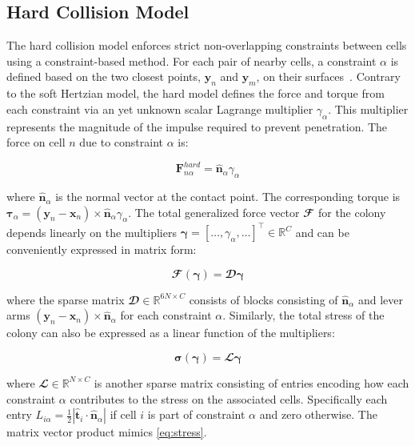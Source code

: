 \documentclass[conference]{IEEEtran}
\begin{document}
\subsection{Hard Collision Model}

The hard collision model enforces strict non-overlapping constraints between cells using a constraint-based method. For each pair of nearby cells, a constraint $\alpha$ is defined based on the two closest points, $\mathbf{y}_n$ and $\mathbf{y}_m$, on their surfaces~\cite{Weady2024SM}. Contrary to the soft Hertzian model, the hard model defines the force and torque from each constraint via an yet unknown scalar Lagrange multiplier $\gamma_\alpha$. This multiplier represents the magnitude of the impulse required to prevent penetration. The force on cell $n$ due to constraint $\alpha$ is:

\begin{equation} \label{eq:constraint_force}
    \mathbf{F}^{hard}_{n\alpha} = \hat{\mathbf{n}}_\alpha \gamma_\alpha
\end{equation}

where $\hat{\mathbf{n}}_\alpha$ is the normal vector at the contact point. The corresponding torque is $\boldsymbol{\tau}_{\alpha} = (\mathbf{y}_n - \mathbf{x}_n) \times \hat{\mathbf{n}}_\alpha \gamma_\alpha$. The total generalized force vector $\mathbfcal{F}$ for the colony depends linearly on the multipliers $\boldsymbol{\gamma} = [\dots, \gamma_\alpha, \dots]^\top \in \mathbb{R}^{C}$ and can be conveniently expressed in matrix form:

\begin{equation}
    \mathbfcal{F}(\boldsymbol{\gamma}) = \mathbfcal{D} \boldsymbol{\gamma}
\end{equation}

where the sparse matrix $\mathbfcal{D} \in \mathbb{R}^{6N \times C}$ consists of blocks consisting of $\hat{\mathbf{n}}_\alpha$ and lever arms $(\mathbf{y}_n - \mathbf{x}_n) \times \hat{\mathbf{n}}_\alpha$ for each constraint $\alpha$. Similarly, the total stress of the colony can also be expressed as a linear function of the multipliers:

\begin{equation}
    \boldsymbol{\sigma}(\boldsymbol{\gamma}) = \mathbfcal{L} \boldsymbol{\gamma}
\end{equation}

where $\mathbfcal{L} \in \mathbb{R}^{N \times C}$ is another sparse matrix consisting of entries encoding how each constraint $\alpha$ contributes to the stress on the associated cells. Specifically each entry $L_{i\alpha} = \frac{1}{2} |\hat{\mathbf{t}}_i \cdot \hat{\mathbf{n}}_\alpha|$ if cell $i$ is part of constraint $\alpha$ and zero otherwise. The matrix vector product mimics \autoref{eq:stress}.
\end{document}
